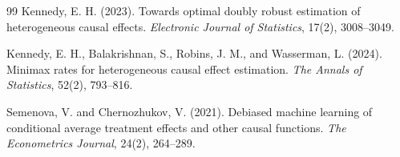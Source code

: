\documentclass[11pt]{article}
\theoremstyle{definition}
\theoremstyle{plain}
\theoremstyle{remark}
\begin{document}
\begin{thebibliography}{99}
Kennedy, E. H. (2023).
Towards optimal doubly robust estimation of heterogeneous causal effects.
\emph{Electronic Journal of Statistics}, 17(2), 3008--3049.

Kennedy, E. H., Balakrishnan, S., Robins, J. M., and Wasserman, L. (2024).
Minimax rates for heterogeneous causal effect estimation.
\emph{The Annals of Statistics}, 52(2), 793--816.

Semenova, V. and Chernozhukov, V. (2021).
Debiased machine learning of conditional average treatment effects and other causal functions.
\emph{The Econometrics Journal}, 24(2), 264--289.
\end{thebibliography}
\end{document}
